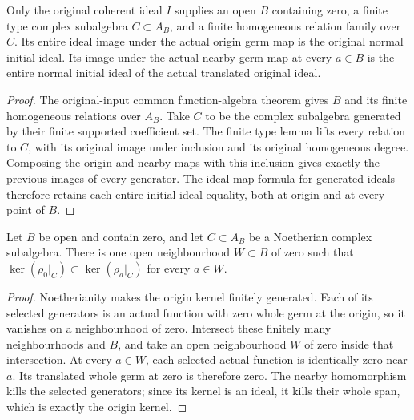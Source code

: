 \begin{theorem}
\label{hir:relative-normal-original-finite-type-coefficient-initial-family}
\leanok
{}
Only the original coherent ideal $I$ supplies an open $B$ containing zero,
a finite type complex subalgebra $C\subset A_B$, and a finite homogeneous
relation family over $C$. Its entire ideal image under the actual origin germ
map is the original normal initial ideal. Its image under the actual nearby
germ map at every $a\in B$ is the entire normal initial ideal of the
actual translated original ideal.
\end{theorem}
\begin{proof}
The original-input common function-algebra theorem gives $B$ and its finite
homogeneous relations over $A_B$. Take $C$ to be the complex subalgebra
generated by their finite supported coefficient set. The finite type lemma
lifts every relation to $C$, with its original image under inclusion and its
original homogeneous degree. Composing the origin and nearby maps with this
inclusion gives exactly the previous images of every generator. The ideal
map formula for generated ideals therefore retains each entire initial-ideal
equality, both at origin and at every point of $B$.
\end{proof}

\begin{lemma}
\label{hir:relative-normal-coefficient-algebra-kernel-spread}
\leanok
{}
Let $B$ be open and contain zero, and let $C\subset A_B$ be a Noetherian
complex subalgebra. There is one open neighbourhood $W\subset B$ of zero
such that $\ker(\rho_0|_C)\subset\ker(\rho_a|_C)$ for every $a\in W$.
\end{lemma}
\begin{proof}
Noetherianity makes the origin kernel finitely generated. Each of its selected
generators is an actual function with zero whole germ at the origin, so it
vanishes on a neighbourhood of zero. Intersect these finitely many
neighbourhoods and $B$, and take an open neighbourhood $W$ of zero inside
that intersection. At every $a\in W$, each selected actual function is
identically zero near $a$. Its translated whole germ at zero is therefore
zero. The nearby homomorphism kills the selected generators; since its kernel
is an ideal, it kills their whole span, which is exactly the origin kernel.
\end{proof}

